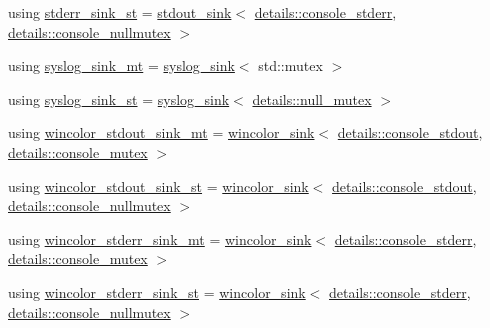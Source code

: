 \begin{DoxyCompactItemize}
\item 
using \hyperlink{namespacespdlog_1_1sinks_ac7f13feb3827330eb5b5c1998356c798}{stderr\+\_\+sink\+\_\+st} = \hyperlink{classspdlog_1_1sinks_1_1stdout__sink}{stdout\+\_\+sink}$<$ \hyperlink{structspdlog_1_1details_1_1console__stderr}{details\+::console\+\_\+stderr}, \hyperlink{structspdlog_1_1details_1_1console__nullmutex}{details\+::console\+\_\+nullmutex} $>$
\item 
using \hyperlink{namespacespdlog_1_1sinks_a6674644a4ab8a7579e45bd79dc107a70}{syslog\+\_\+sink\+\_\+mt} = \hyperlink{classspdlog_1_1sinks_1_1syslog__sink}{syslog\+\_\+sink}$<$ std\+::mutex $>$
\item 
using \hyperlink{namespacespdlog_1_1sinks_a83f4d6616a2fbf3473a6a979647b5139}{syslog\+\_\+sink\+\_\+st} = \hyperlink{classspdlog_1_1sinks_1_1syslog__sink}{syslog\+\_\+sink}$<$ \hyperlink{structspdlog_1_1details_1_1null__mutex}{details\+::null\+\_\+mutex} $>$
\item 
using \hyperlink{namespacespdlog_1_1sinks_a93242506c736c358ca4ef36286dedb41}{wincolor\+\_\+stdout\+\_\+sink\+\_\+mt} = \hyperlink{classspdlog_1_1sinks_1_1wincolor__sink}{wincolor\+\_\+sink}$<$ \hyperlink{structspdlog_1_1details_1_1console__stdout}{details\+::console\+\_\+stdout}, \hyperlink{structspdlog_1_1details_1_1console__mutex}{details\+::console\+\_\+mutex} $>$
\item 
using \hyperlink{namespacespdlog_1_1sinks_ad668215540fc681bd8051e6a8a0c714c}{wincolor\+\_\+stdout\+\_\+sink\+\_\+st} = \hyperlink{classspdlog_1_1sinks_1_1wincolor__sink}{wincolor\+\_\+sink}$<$ \hyperlink{structspdlog_1_1details_1_1console__stdout}{details\+::console\+\_\+stdout}, \hyperlink{structspdlog_1_1details_1_1console__nullmutex}{details\+::console\+\_\+nullmutex} $>$
\item 
using \hyperlink{namespacespdlog_1_1sinks_a44bdf82d709a56703eb208cd584529e5}{wincolor\+\_\+stderr\+\_\+sink\+\_\+mt} = \hyperlink{classspdlog_1_1sinks_1_1wincolor__sink}{wincolor\+\_\+sink}$<$ \hyperlink{structspdlog_1_1details_1_1console__stderr}{details\+::console\+\_\+stderr}, \hyperlink{structspdlog_1_1details_1_1console__mutex}{details\+::console\+\_\+mutex} $>$
\item 
using \hyperlink{namespacespdlog_1_1sinks_a23305ec4888b5d6d70335c0ae86b2b05}{wincolor\+\_\+stderr\+\_\+sink\+\_\+st} = \hyperlink{classspdlog_1_1sinks_1_1wincolor__sink}{wincolor\+\_\+sink}$<$ \hyperlink{structspdlog_1_1details_1_1console__stderr}{details\+::console\+\_\+stderr}, \hyperlink{structspdlog_1_1details_1_1console__nullmutex}{details\+::console\+\_\+nullmutex} $>$
\end{DoxyCompactItemize}


